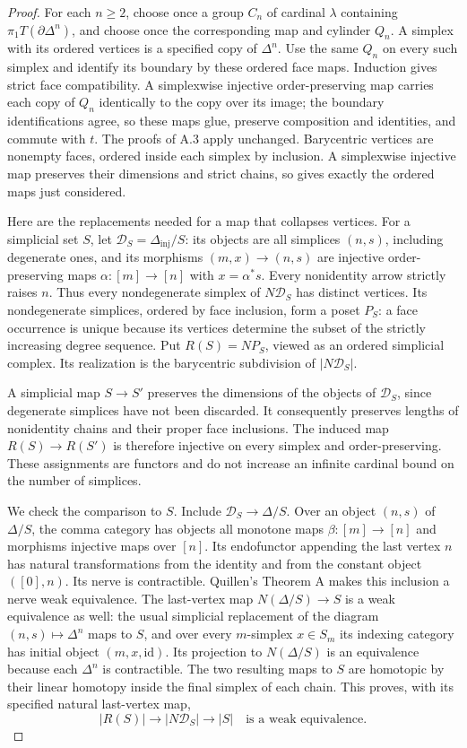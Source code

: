 \begin{proof}
For each $n\geq2$, choose once a group $C_n$ of cardinal $\lambda$
containing $\pi_1T(\partial\Delta^n)$, and choose once the corresponding
map and cylinder $Q_n$. A simplex with its ordered vertices is a
specified copy of $\Delta^n$. Use the same $Q_n$ on every such simplex
and identify its boundary by these ordered face maps. Induction gives
strict face compatibility. A simplexwise injective order-preserving
map carries each copy of $Q_n$ identically to the copy over its image;
the boundary identifications agree, so these maps glue, preserve
composition and identities, and commute with $t$. The proofs of A.3
apply unchanged. Barycentric vertices are nonempty faces, ordered
inside each simplex by inclusion. A simplexwise injective map
preserves their dimensions and strict chains, so gives exactly the
ordered maps just considered.

Here are the replacements needed for a map that collapses vertices.
For a simplicial set $S$, let $\mathcal D_S=\Delta_{\mathrm{inj}}/S$:
its objects are all simplices $(n,s)$, including degenerate ones, and
its morphisms $(m,x)\to(n,s)$ are injective order-preserving maps
$\alpha:[m]\to[n]$ with $x=\alpha^*s$. Every nonidentity arrow
strictly raises $n$. Thus every nondegenerate simplex of
$N\mathcal D_S$ has distinct vertices. Its nondegenerate simplices,
ordered by face inclusion, form a poset $P_S$: a face occurrence is
unique because its vertices determine the subset of the strictly
increasing degree sequence. Put $R(S)=NP_S$, viewed as an ordered
simplicial complex. Its realization is the barycentric subdivision
of $|N\mathcal D_S|$.

A simplicial map $S\to S'$ preserves the dimensions of the objects of
$\mathcal D_S$, since degenerate simplices have not been discarded.
It consequently preserves lengths of nonidentity chains and their
proper face inclusions. The induced map $R(S)\to R(S')$ is therefore
injective on every simplex and order-preserving. These assignments
are functors and do not increase an infinite cardinal bound on the
number of simplices.

We check the comparison to $S$. Include
$\mathcal D_S\to\Delta/S$. Over an object $(n,s)$ of $\Delta/S$, the
comma category has objects all monotone maps $\beta:[m]\to[n]$ and
morphisms injective maps over $[n]$. Its endofunctor appending the
last vertex $n$ has natural transformations from the identity and
from the constant object $([0],n)$. Its nerve is contractible.
Quillen's Theorem A makes this inclusion a nerve weak equivalence.
The last-vertex map $N(\Delta/S)\to S$ is a weak equivalence as well:
the usual simplicial replacement of the diagram
$(n,s)\mapsto\Delta^n$ maps to $S$, and over every $m$-simplex
$x\in S_m$ its indexing category has initial object $(m,x,\mathrm{id})$.
Its projection to $N(\Delta/S)$ is an equivalence because each
$\Delta^n$ is contractible. The two resulting maps to $S$ are
homotopic by their linear homotopy inside the final simplex of each
chain. This proves, with its specified natural last-vertex map,
\[
 |R(S)|\longrightarrow |N\mathcal D_S|\longrightarrow |S|
 \quad\text{is a weak equivalence.}
\]


\end{proof}
